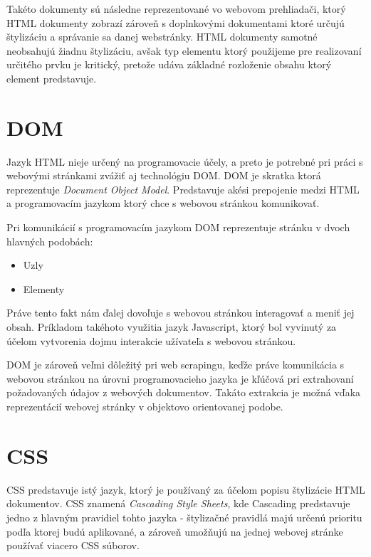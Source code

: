 Takéto dokumenty sú následne reprezentované vo webovom prehliadači, ktorý HTML dokumenty zobrazí zároveň s doplnkovými dokumentami ktoré určujú štylizáciu a správanie sa danej webstránky. HTML dokumenty samotné neobsahujú žiadnu štylizáciu, avšak typ elementu ktorý použijeme pre realizovaní určitého prvku je kritický, pretože udáva základné rozloženie obsahu ktorý element predstavuje.\cite{WhatisHTML}

\section{DOM}
\label{DOM}

Jazyk HTML nieje určený na programovacie účely, a preto je potrebné pri práci s webovými stránkami zvážiť aj technológiu DOM. DOM je skratka ktorá reprezentuje \textit{Document Object Model}. Predstavuje akési prepojenie medzi HTML a programovacím jazykom ktorý chce s webovou stránkou komunikovať. \cite{DOM}

Pri komunikácií s programovacím jazykom DOM reprezentuje stránku v dvoch hlavných podobách:

\begin{itemize}
    \item {Uzly}
    \item {Elementy}
\end{itemize}

Práve tento fakt nám ďalej dovoľuje s webovou stránkou interagovať a meniť jej obsah. Príkladom takéhoto využitia jazyk Javascript, ktorý bol vyvinutý za účelom vytvorenia dojmu interakcie užívateľa s webovou stránkou. 

DOM je zároveň veľmi dôležitý pri web scrapingu, keďže práve komunikácia s webovou stránkou na úrovni programovacieho jazyka je kľúčová pri extrahovaní požadovaných údajov z webových dokumentov. Takáto extrakcia je možná vďaka reprezentácií webovej stránky v objektovo orientovanej podobe.

\section{CSS}

CSS predstavuje istý jazyk, ktorý je používaný za účelom popisu štylizácie HTML dokumentov. CSS znamená \textit{Cascading Style Sheets}, kde Cascading predstavuje jedno z hlavným pravidiel tohto jazyka - štylizačné pravidlá majú určenú prioritu podľa ktorej budú aplikované, a zároveň umožňujú na jednej webovej stránke používať viacero CSS súborov. 

